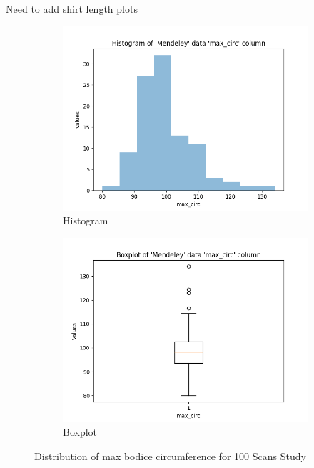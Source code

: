 Need to add shirt length plots
\begin{figure}[H]
    \centering
    \begin{subfigure}[b]{0.45\textwidth}
        \centering
        \includegraphics[width=\textwidth]{Images/Mendeley_max_circ_Hist.png}
        \caption{Histogram}
    \end{subfigure}
    \hfill
    \begin{subfigure}[b]{0.45\textwidth}
        \centering
        \includegraphics[width=\textwidth]{Images/Mendeley_max_circ_Boxplot.png}
        \caption{Boxplot}
    \end{subfigure}
    \caption{Distribution of max bodice circumference for 100 Scans Study}
\end{figure}

